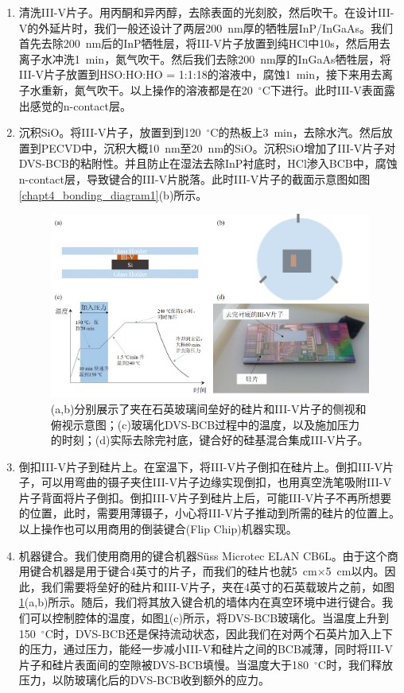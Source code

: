 \begin{enumerate}[(1)]
	\item 清洗III-V片子。用丙酮和异丙醇，去除表面的光刻胶，然后吹干。在设计III-V的外延片时，我们一般还设计了两层200~nm厚的牺牲层InP/InGaAs。我们首先去除200~nm后的InP牺牲层，将III-V片子放置到纯HCl中10s，然后用去离子水冲洗1~min，氮气吹干。然后我们去除200~nm厚的InGaAs牺牲层，将III-V片子放置到HSO:HO:HO = 1:1:18的溶液中，腐蚀1~min，接下来用去离子水重新，氮气吹干。以上操作的溶液都是在20~$^{\circ}$C下进行。此时III-V表面露出感觉的n-contact层。
	\item 沉积SiO。将III-V片子，放置到到120~$^{\circ}$C的热板上3~min，去除水汽。然后放置到PECVD中，沉积大概10~nm至20~nm的SiO。沉积SiO增加了III-V片子对DVS-BCB的粘附性。并且防止在湿法去除InP衬底时，HCl渗入BCB中，腐蚀n-contact层，导致键合的III-V片脱落。此时III-V片子的截面示意图如图\ref{chapt4_bonding_diagram1}(b)所示。
	\begin{figure}[htb]
		\centering
		\includegraphics[width=14cm]{./Pictures/chapt4_bonding_diagram2.jpg}
		\caption{(a,b)分别展示了夹在石英玻璃间垒好的硅片和III-V片子的侧视和俯视示意图；(c)玻璃化DVS-BCB过程中的温度，以及施加压力的时刻；(d)实际去除完衬底，键合好的硅基混合集成III-V片子。}
		\label{chapt4_bonding_diagram2}
	\end{figure}
	\item 倒扣III-V片子到硅片上。在室温下，将III-V片子倒扣在硅片上。倒扣III-V片子，可以用弯曲的镊子夹住III-V片子边缘实现倒扣，也用真空洗笔吸附III-V片子背面将片子倒扣。倒扣III-V片子到硅片上后，可能III-V片子不再所想要的位置，此时，需要用薄镊子，小心将III-V片子推动到所需的硅片的位置上。以上操作也可以用商用的倒装键合(Flip Chip)机器实现。
	\item 机器键合。我们使用商用的键合机器S{\"u}ss Microtec ELAN CB6L。由于这个商用键合机器是用于键合4英寸的片子，而我们的硅片也就5~cm$\times$5~cm以内。因此，我们需要将垒好的硅片和III-V片子，夹在4英寸的石英载玻片之前，如图\ref{chapt4_bonding_diagram2}(a,b)所示。随后，我们将其放入键合机的墙体内在真空环境中进行键合。我们可以控制腔体的温度，如图\ref{chapt4_bonding_diagram2}(c)所示，将DVS-BCB玻璃化。当温度上升到150~$^{\circ}$C时，DVS-BCB还是保持流动状态，因此我们在对两个石英片加入上下的压力，通过压力，能经一步减小III-V和硅片之间的BCB减薄，同时将III-V片子和硅片表面间的空隙被DVS-BCB填慢。当温度大于180~$^{\circ}$C时，我们释放压力，以防玻璃化后的DVS-BCB收到额外的应力。

\end{enumerate}
